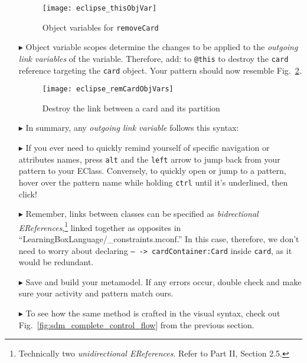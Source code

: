 \begin{itemize}
\begin{figure}[htp]
\begin{center}
  \texttt{[image: eclipse\_thisObjVar]}
  \caption{Object variables for \texttt{removeCard}}
  \label{fig:remCardObjVar}
\end{center}
\end{figure}

\item[$\blacktriangleright$] Object variable scopes determine the changes to be applied to the \emph{outgoing link variables} of the variable. Therefore, add:
 to \texttt{@this} to destroy the \texttt{card} reference targeting the \texttt{card} object. Your pattern should now resemble
Fig.~\ref{fig:deleteReference}. 

\begin{figure}[htp]
\begin{center}
    \texttt{[image: eclipse\_remCardObjVars]}
  \caption{Destroy the link between a card and its partition}
  \label{fig:deleteReference}
\end{center}
\end{figure}
\newpage

\item[$\blacktriangleright$] In summary, any \emph{outgoing link variable} follows this syntax:


\item[$\blacktriangleright$] If you ever need to quickly remind yourself of specific navigation or attributes names, press \texttt{alt} and the \texttt{left}
arrow to jump back from your pattern to your EClass. Conversely, to quickly open or jump to a pattern, hover over the pattern name while holding \texttt{ctrl}
until it's underlined, then click!

\item[$\blacktriangleright$] Remember, links between classes can be specified as \emph{bidrectional EReferences},\footnote{Technically two
\emph{unidirectional EReferences}. Refer to Part II, Section 2.5.} linked together as opposites in ``LearningBoxLanguage/\_con\-straints.mconf.'' In this case,
therefore, we don't need to worry about declaring \texttt{-- -> cardContainer:Card} inside \texttt{card}, as it would be redundant.

\item[$\blacktriangleright$] Save and build your metamodel. If any errors occur, double check and make sure your activity and pattern match ours. 

\item[$\blacktriangleright$] To see how the same method is crafted in the visual syntax, check out Fig.~\ref{fig:sdm_complete_control_flow} from the previous
section.

\end{itemize}
